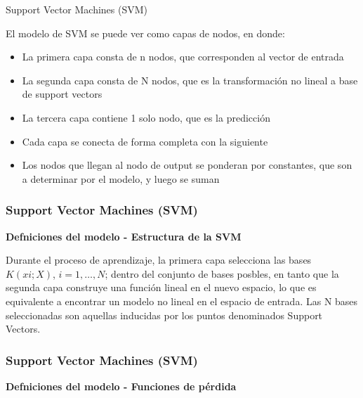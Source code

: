\documentclass[spanish,xcolor=table]{beamer}
\begin{document}
\begin{section}{Support Vector Machines (SVM)}
\begin{frame}
El modelo de SVM se puede ver como capas de nodos, en donde: \\
\begin{itemize}
  \item La primera capa consta de n nodos, que corresponden al vector de entrada 
  \item La segunda capa consta de N nodos, que es la transformaci\'on no lineal a base de support vectors 
  \item La tercera capa contiene 1 solo nodo, que es la predicci\'on 
  \item Cada capa se conecta de forma completa con la siguiente 
  \item Los nodos que llegan al nodo de output se ponderan por constantes, que son a determinar por el modelo, y luego se suman 
\end{itemize}    

\end{frame}
\begin{frame}
\frametitle{Support Vector Machines (SVM)}
\textbf{Defniciones del modelo - Estructura de la SVM}
 
Durante el proceso de aprendizaje, la primera capa selecciona las bases $K(xi; X)$, $i = 1, \dots, N$; dentro del conjunto de bases posbles, en tanto que la segunda capa construye una funci\'on lineal en el nuevo espacio, lo que es equivalente a encontrar un modelo no lineal en el espacio de entrada. Las N bases seleccionadas son aquellas inducidas por los puntos denominados Support Vectors. 

\end{frame}
\begin{frame}
\frametitle{Support Vector Machines (SVM)}
\textbf{Defniciones del modelo - Funciones de p\'erdida}
 

\end{frame}
\end{section}
\end{document}
